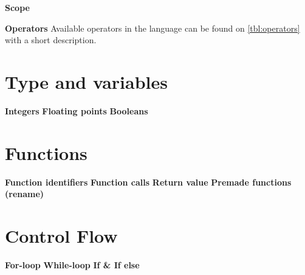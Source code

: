 \textbf{Scope}

\textbf{Operators}
Available operators in the language can be found on \ref{tbl:operators} with a short description.
   


\section{Type and variables}
\textbf{Integers}
\textbf{Floating points}
\textbf{Booleans}

\section{Functions}
\textbf{Function identifiers}
\textbf{Function calls}
\textbf{Return value}
\textbf{Premade functions (rename)}

\section{Control Flow}
\textbf{For-loop}
\textbf{While-loop}
\textbf{If \& If else}